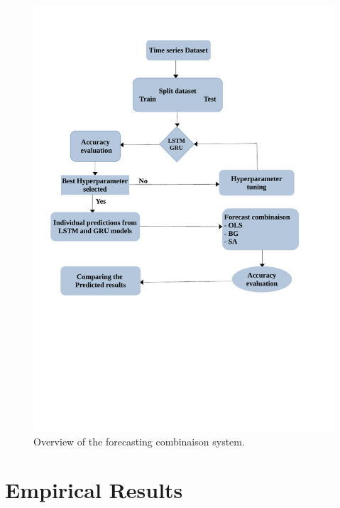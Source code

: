 \documentclass{dsfe}
\begin{document}
\begin{figure}[H]
\centering
\includegraphics[scale=0.8]{method.pdf}
\caption{Overview of the forecasting combinaison system.}\label{method}
\end{figure}

\section{Empirical Results}
\end{document}
